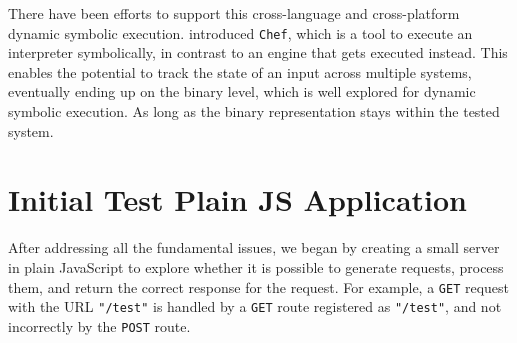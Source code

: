 There have been efforts to support this cross-language and cross-platform dynamic symbolic execution. \citet{bucur_prototyping_2014} introduced \texttt{Chef}, which is a tool to execute an interpreter symbolically, in contrast to an engine that gets executed instead. This enables the potential to track the state of an input across multiple systems, eventually ending up on the binary level, which is well explored for dynamic symbolic execution. As long as the binary representation stays within the tested system. 

%
%
%
%
\section{Initial Test Plain JS Application}
\label{sec:init-test-plain}
After addressing all the fundamental issues, we began by creating a small server in plain JavaScript to explore whether it is possible to generate requests, process them, and return the correct response for the request. For example, a \texttt{GET} request with the URL \lstinline{"/test"} is handled by a \texttt{GET} route registered as \lstinline{"/test"}, and not incorrectly by the \texttt{POST} route. 

